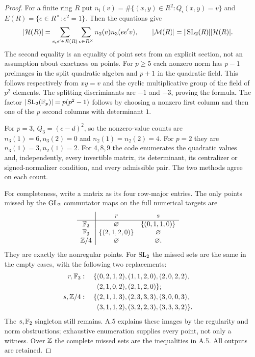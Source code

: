 \begin{proof}
For a finite ring $R$ put
$n_i(v)=\#\{(x,y)\in R^2:Q_i(x,y)=v\}$ and
$E(R)=\{e\in R^\times:e^2=1\}$. Then the equations give
\[
 |\mathcal H(R)|=
 \sum_{e,e'\in E(R)}\sum_{v\in R^\times}
 n_2(v)n_3(ee'v),\qquad
 |\mathcal M(R)|=|\operatorname{SL}_2(R)||\mathcal H(R)|.
\]
The second equality is an equality of point sets from an
explicit section, not an assumption about exactness on
points. For $p\ge5$ each nonzero norm has $p-1$ preimages
in the split quadratic algebra and $p+1$ in the quadratic
field. This follows respectively from $xy=v$ and the
cyclic multiplicative group of the field of $p^2$ elements.
The splitting discriminants are $-1$ and $-3$, proving
the formula. The factor $|\operatorname{SL}_2(\mathbb F_p)|=p(p^2-1)$ follows
by choosing a nonzero first column and then one of the $p$
second columns with determinant $1$.

For $p=3$, $Q_3=(c-d)^2$, so the nonzero-value counts
are $n_3(1)=6,n_3(2)=0$ and $n_2(1)=n_2(2)=4$.
For $p=2$ they are $n_3(1)=3,n_2(1)=2$.
For $4,8,9$ the code enumerates the quadratic values and,
independently, every invertible matrix, its determinant,
its centralizer or signed-normalizer condition, and every
admissible pair. The two methods agree on each count.

For completeness, write a matrix as its four row-major
entries. The only points missed by the $\operatorname{GL}_2$ commutator
maps on the full numerical targets are
\[
 \begin{array}{c|cc}
 &r&s\\\hline
 \mathbb F_2&\varnothing&\{(0,1,1,0)\}\\
 \mathbb F_3&\{(2,1,2,0)\}&\varnothing\\
 \mathbb Z/4&\varnothing&\varnothing.
 \end{array}
\]
They are exactly the nonregular points. For $\operatorname{SL}_2$ the
missed sets are the same in the empty cases, with the
following two replacements:
\[
\begin{split}
r,\mathbb F_3:\quad\{&(0,2,1,2),(1,1,2,0),(2,0,2,2),\\
 &(2,1,0,2),(2,1,2,0)\};\\
s,\mathbb Z/4:\quad\{&(2,1,1,3),(2,3,3,3),(3,0,0,3),\\
 &(3,1,1,2),(3,2,2,3),(3,3,3,2)\}.
\end{split}
\]
The $s,\mathbb F_2$ singleton still remains. A.5 explains these
images by the regularity and norm obstructions; exhaustive
enumeration supplies every point, not only a witness.
Over $\mathbb Z$ the complete missed sets are the inequalities
in A.5. All outputs are retained.
\end{proof}


